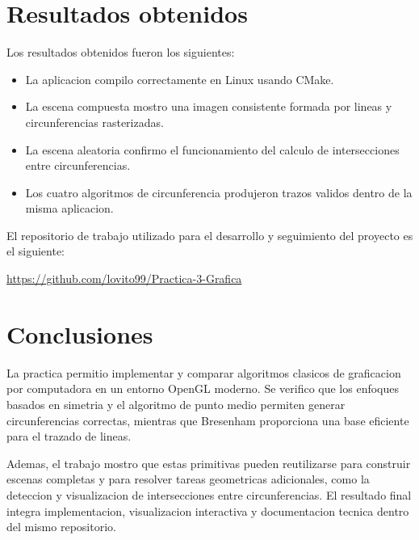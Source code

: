 \documentclass[12pt,a4paper]{article}
\begin{document}
\section{Resultados obtenidos}

Los resultados obtenidos fueron los siguientes:

\begin{itemize}
	\item La aplicacion compilo correctamente en Linux usando CMake.
	\item La escena compuesta mostro una imagen consistente formada por lineas y circunferencias rasterizadas.
	\item La escena aleatoria confirmo el funcionamiento del calculo de intersecciones entre circunferencias.
	\item Los cuatro algoritmos de circunferencia produjeron trazos validos dentro de la misma aplicacion.
\end{itemize}

El repositorio de trabajo utilizado para el desarrollo y seguimiento del proyecto es el siguiente:

\begin{center}
	\url{https://github.com/lovito99/Practica-3-Grafica}
\end{center}

\section{Conclusiones}

La practica permitio implementar y comparar algoritmos clasicos de graficacion por computadora en un entorno OpenGL moderno. Se verifico que los enfoques basados en simetria y el algoritmo de punto medio permiten generar circunferencias correctas, mientras que Bresenham proporciona una base eficiente para el trazado de lineas.

Ademas, el trabajo mostro que estas primitivas pueden reutilizarse para construir escenas completas y para resolver tareas geometricas adicionales, como la deteccion y visualizacion de intersecciones entre circunferencias. El resultado final integra implementacion, visualizacion interactiva y documentacion tecnica dentro del mismo repositorio.
\end{document}
